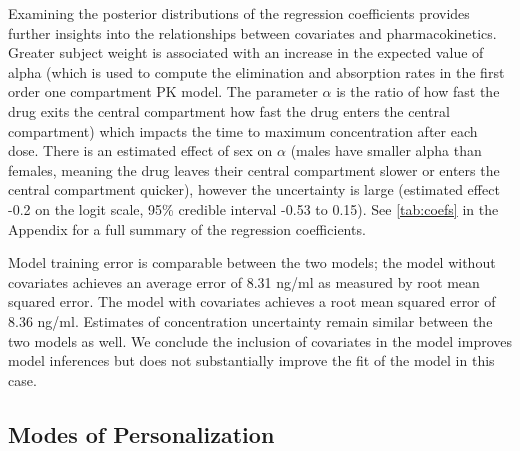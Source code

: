 Examining the posterior distributions of the regression coefficients provides further insights into the relationships between covariates and pharmacokinetics. Greater subject weight is associated with an increase in the expected value of alpha (which is used to compute the elimination and absorption rates in the first order one compartment PK model.  The parameter $ \alpha $ is the ratio of how fast the drug exits the central compartment  how fast the drug enters the central compartment) which impacts the time to maximum concentration after each dose.  There is an estimated effect of sex on $ \alpha $ (males have smaller alpha than females, meaning the drug leaves their central compartment slower or enters the central compartment quicker), however the uncertainty is large (estimated effect -0.2 on the logit scale, 95\% credible interval -0.53 to 0.15). See \cref{tab:coefs} in the Appendix for a full summary of the regression coefficients.




Model training error is comparable between the two models; the model without covariates achieves an average error of 8.31 ng/ml as measured by root mean squared error.  The model with covariates achieves a root mean squared error of 8.36  ng/ml.  Estimates of concentration uncertainty remain similar between the two models as well.  We conclude the inclusion of covariates in the model improves model inferences but does not substantially improve the fit of the model in this case.




\subsection{Modes of Personalization}



